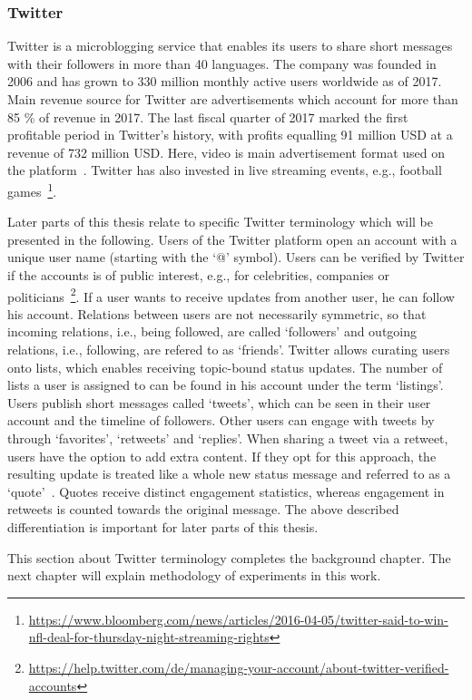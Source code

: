 \subsubsection{Twitter}
\label{sub:sn_twitter}

Twitter is a microblogging service that enables its users to share short
messages with their followers in more than 40 languages.
The company was founded in 2006 and has grown to 330 million monthly active
users worldwide as of 2017.
Main revenue source for Twitter are advertisements which account for more than
85 \% of revenue in 2017.
The last fiscal quarter of 2017 marked the first profitable period in Twitter's
history, with profits equalling 91 million USD at a revenue of 732 million USD.
Here, video is main advertisement format used on the platform~\cite{Twitter2018}.
Twitter has also invested in live streaming events, e.g., football games~\footnote{\url{https://www.bloomberg.com/news/articles/2016-04-05/twitter-said-to-win-nfl-deal-for-thursday-night-streaming-rights}}.

Later parts of this thesis relate to specific Twitter terminology which will be 
presented in the following.
Users of the Twitter platform open an account with a unique user name (starting
with the `@' symbol).
Users can be verified by Twitter if the accounts is of public interest, e.g.,
for celebrities, companies or politicians~\footnote{\url{https://help.twitter.com/de/managing-your-account/about-twitter-verified-accounts}}.
If a user wants to receive updates from another user, he can follow his
account.
Relations between users are not necessarily symmetric, so that incoming relations,
i.e., being followed, are called `followers' and outgoing relations, i.e.,
following, are refered to as `friends'.
Twitter allows curating users onto lists, which enables receiving topic-bound
status updates.
The number of lists a user is assigned to can be found in his account under the
term `listings'.
Users publish short messages called `tweets', which can be seen in their user
account and the timeline of followers.
Other users can engage with tweets by through `favorites', `retweets' and `replies'.
When sharing a tweet via a retweet, users have the option to add extra content.
If they opt for this approach, the resulting update is treated like a whole new
status message and referred to as a `quote'~\cite{Kwak2010}.
Quotes receive distinct engagement statistics, whereas engagement in retweets
is counted towards the original message.
The above described differentiation is important for later parts of this thesis.

This section about Twitter terminology completes the background chapter.
The next chapter will explain methodology of experiments in this work.
